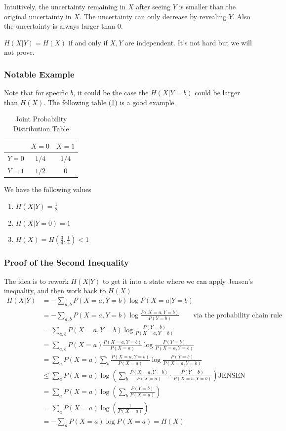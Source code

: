 \documentclass{article}
\begin{document}
Intuitively, the uncertainty remaining in $X$ after seeing $Y$ is smaller than the original uncertainty in $X$. The uncertainty can only decrease by revealing $Y$. Also the uncertainty is always larger than $0$.

$H(X|Y)=H(X)$ if and only if $X,Y$ are independent. It's not hard but we will not prove.

\subsubsection{Notable Example}

Note that for specific $b$, it could be the case the $H(X|Y=b)$ could be larger than $H(X)$. The following table (\ref{tab:joint_prob_dist}) is a good example.
\begin{table}[h]
\centering
\begin{tabular}{|c|c|c|}
\hline
& $X=0$ & $X=1$ \\ \hline
$Y=0 $ & $1/4$ & $1/4$  \\ \hline
$Y=1$ & $1/2$ & 0  \\ \hline
\end{tabular}
\caption{Joint Probability Distribution Table}
\label{tab:joint_prob_dist}
\end{table}

We have the following values
\begin{enumerate}
    \item $H(X|Y)=\frac{1}{2}$
    \item $H(X|Y=0)=1$
    \item $H(X)=H(\frac{3}{4},\frac{1}{4} )<1$
\end{enumerate}

\subsubsection{Proof of the Second Inequality}
The idea is to rework $H(X|Y)$ to get it into a state where we can apply Jensen's inequality, and then work back to $H(X)$
\begin{align*}
    H(X|Y) &= - \sum_{a,b}P(X=a,Y=b)\log P(X=a| Y=b)\\
    &= -\sum_{a,b} P(X=a,Y=b)\log\frac{P(X=a,Y=b)}{P(Y=b)} \qquad\text{via the probability chain rule}\\
    &= \sum_{a,b}P(X=a,Y=b) \log\frac{P(Y=b)}{P(X=a,Y=b)}\\
    &= \sum_{a,b} P(X=a)\frac{P(X=a,Y=b)}{P(X=a)} \log\frac{P(Y=b)}{P(X=a,Y=b)}\\
    &= \sum_a P(X=a) \sum_b \frac{P(X=a,Y=b)}{P(X=a)}\log\frac{P(Y=b)}{P(X=a,Y=b)}\\
    &\leq \sum_a  P(X=a) \log \left(\sum_b \frac{P(X=a,Y=b)}{P(X=a)}\cdot \frac{P(Y=b)}{P(X=a,Y=b)}\right) \text{JENSEN}\\
    &= \sum_a P(X=a) \log\left(\sum_b \frac{P(Y=b)}{P(X=a)} \right)\\
    &=\sum_a P(X=a) \log\left(\frac{1}{P(X=a)} \right)\\
    &= -\sum_a P(X=a)\log P(X=a)=H(X)
\end{align*}
\end{document}
